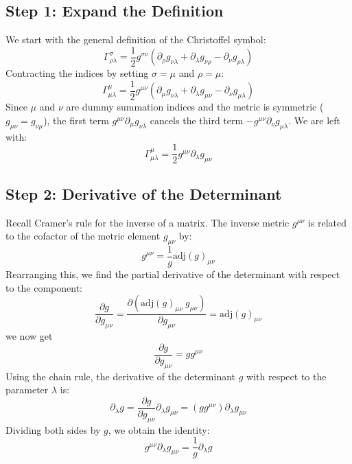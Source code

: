 \documentclass[11pt, a4paper]{report}
\begin{document}
\subsection*{Step 1: Expand the Definition}
We start with the general definition of the Christoffel symbol:
\begin{equation}
    \Gamma^\sigma_{\rho\lambda} = \frac{1}{2} g^{\sigma\nu} (\partial_\rho g_{\nu\lambda} + \partial_\lambda g_{\nu\rho} - \partial_\nu g_{\rho\lambda})
\end{equation}
Contracting the indices by setting $\sigma = \mu$ and $\rho = \mu$:
\begin{equation}
    \Gamma^\mu_{\mu\lambda} = \frac{1}{2} g^{\mu\nu} (\partial_\mu g_{\nu\lambda} + \partial_\lambda g_{\mu\nu} - \partial_\nu g_{\mu\lambda})
\end{equation}
Since $\mu$ and $\nu$ are dummy summation indices and the metric is symmetric ($g_{\mu\nu} = g_{\nu\mu}$), the first term $g^{\mu\nu}\partial_\mu g_{\nu\lambda}$ cancels the third term $-g^{\mu\nu}\partial_\nu g_{\mu\lambda}$. We are left with:
\begin{equation} \label{eq:gamma_contracted}
    \Gamma^\mu_{\mu\lambda} = \frac{1}{2} g^{\mu\nu} \partial_\lambda g_{\mu\nu}
\end{equation}

\subsection*{Step 2: Derivative of the Determinant}
Recall Cramer's rule for the inverse of a matrix. The inverse metric $g^{\mu\nu}$ is related to the cofactor of the metric element $g_{\mu\nu}$ by:
\begin{equation}
    g^{\mu\nu} = \frac{1}{g} \text{adj}(g)_{\mu\nu}
\end{equation}
Rearranging this, we find the partial derivative of the determinant with respect to the component:
\begin{equation}
    \frac{\partial g}{\partial g_{\mu\nu}}=\frac{\partial(\text{adj}(g)_{\mu\nu} \ g_{\mu \nu})}{\partial g_{\mu \nu}} =  \text{adj}(g)_{\mu\nu}
\end{equation}
we now get 
\begin{equation}
    \frac{\partial g}{\partial g_{\mu\nu}} = g g^{\mu\nu}
\end{equation}
Using the chain rule, the derivative of the determinant $g$ with respect to the parameter $\lambda$ is:
\begin{equation}
    \partial_\lambda g = \frac{\partial g}{\partial g_{\mu\nu}} \partial_\lambda g_{\mu\nu} = (g g^{\mu\nu}) \partial_\lambda g_{\mu\nu}
\end{equation}
Dividing both sides by $g$, we obtain the identity:
\begin{equation} \label{eq:trace_identity}
    g^{\mu\nu} \partial_\lambda g_{\mu\nu} = \frac{1}{g} \partial_\lambda g
\end{equation}
\end{document}
